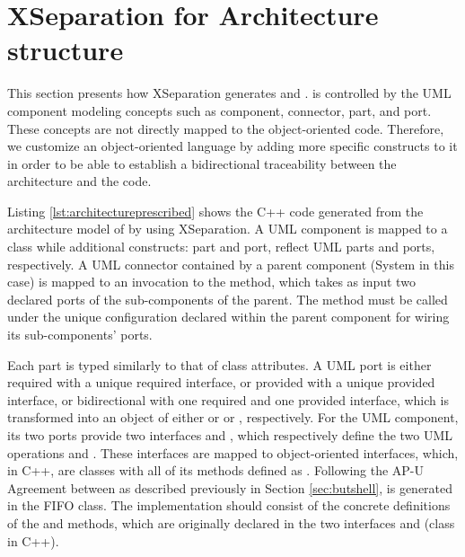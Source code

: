 \section{XSeparation for Architecture structure}
\label{sec:xseparationarchitecture}
This section presents how XSeparation generates  and .
 is controlled by the UML component modeling concepts such as component, connector, part, and port.
These concepts are not directly mapped to the object-oriented code.
Therefore, we customize an object-oriented language by adding more specific constructs to it in order to be able to establish a bidirectional traceability between the architecture and the code.

Listing \ref{lst:architectureprescribed} shows the C++ code generated from the architecture model of  by using XSeparation.
A UML component is mapped to a class while additional constructs: part and port, reflect UML parts and ports, respectively.
A UML connector contained by a parent component (System in this case) is mapped to an invocation to the  method, which takes as input two declared ports of the sub-components of the parent.
The  method must be called under the unique configuration declared within the parent component for wiring its sub-components' ports.






Each part is typed similarly to that of class attributes.
A UML port is either required with a unique required interface, or provided with a unique provided interface, or bidirectional with one required and one provided interface, which is transformed into an object of either  or  or , respectively.
For the UML  component, its two ports provide two interfaces  and , which respectively define the two UML operations  and .
These interfaces are mapped to object-oriented interfaces, which, in C++, are classes with all of its methods defined as .
Following the AP-U Agreement between as described previously in Section \ref{sec:butshell},  is generated in the FIFO class. 
The implementation should consist of the concrete definitions of the  and  methods, which are originally declared in the two interfaces  and  (class in C++).


